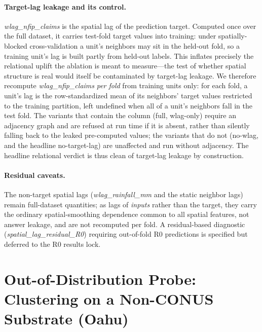 \paragraph{Target-lag leakage and its control.}
\textit{wlag\_nfip\_claims} is the spatial lag of the prediction target.
Computed once over the full dataset, it carries test-fold target values
into training: under spatially-blocked cross-validation a unit's neighbors
may sit in the held-out fold, so a training unit's lag is built partly from
held-out labels. This inflates precisely the relational uplift the ablation
is meant to measure---the test of whether spatial structure is real would
itself be contaminated by target-lag leakage. We therefore recompute
\textit{wlag\_nfip\_claims} \emph{per fold} from training units only: for
each fold, a unit's lag is the row-standardized mean of its neighbors'
target values restricted to the training partition, left undefined when all
of a unit's neighbors fall in the test fold. The variants that contain the
column (full, wlag-only) require an adjacency graph and are refused at
run time if it is absent, rather than silently falling back to the leaked
pre-computed values; the variants that do not (no-wlag, and the
headline no-target-lag) are unaffected and run without adjacency. The
headline relational verdict is thus clean of target-lag leakage by
construction.

\paragraph{Residual caveats.} The non-target spatial lags
(\textit{wlag\_rainfall\_mm} and the static neighbor lags) remain
full-dataset quantities; as lags of \emph{inputs} rather than the target,
they carry the ordinary spatial-smoothing dependence common to all spatial
features, not answer leakage, and are not recomputed per fold. A
residual-based diagnostic (\textit{spatial\_lag\_residual\_R0}) requiring
out-of-fold R0 predictions is specified but deferred to the R0 results
lock.

\section{Out-of-Distribution Probe: Clustering on a Non-CONUS Substrate (Oahu)}
\label{app:oahu}

